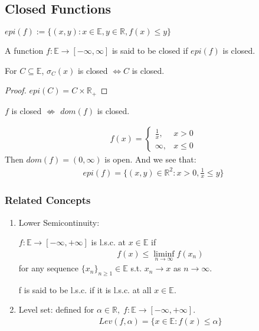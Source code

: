 \documentclass[11pt]{article}
\begin{document}
\subsection{Closed Functions}
\begin{definition}
    $epi(f) := \{ (x,y): x \in \mathbb{E}, y \in \mathbb{R}, f(x) \le y \}$
\end{definition}

\begin{definition}
    A function $f: \mathbb{E} \to [-\infty,\infty]$ is said to be closed if $epi(f)$ is closed.
\end{definition}

\begin{proposition}
    For $C \subseteq \mathbb{E}$, $\sigma_{C}(x)$ is closed $\iff C$ is closed.
\end{proposition}
\begin{proof}
    $epi(C) = C \times \mathbb{R}_{+}$
\end{proof}

\begin{remark}
    $f$ is closed $\not\iff$ $dom(f)$ is closed.
\end{remark}

\begin{example}
    \begin{align*}
        f(x) = \begin{cases} 
        \frac{1}{x}, &x > 0  \\ 
        \infty, & x \le 0   
        \end{cases}
    \end{align*}
    Then $dom(f) = (0,\infty)$ is open. And we see that:
    \begin{align*}
        epi(f) = \{ (x,y) \in \mathbb{R}^{2}: x>0, \frac{1}{x} \le y \}
    \end{align*}
\end{example}

\subsubsection{Related Concepts}
\begin{enumerate}
    \item Lower Semicontinuity:
    \begin{definition}
        $f:\mathbb{E} \to [-\infty,+\infty]$ is l.s.c. at $x \in \mathbb{E}$ if 
        \begin{align*}
            f(x) \le \liminf_{n \to \infty} f(x_n) 
        \end{align*}
        for any sequence $\{ x_n  \}_{n\ge 1} \in \mathbb{E}$ s.t.
        $x_n \to x $ as $n \to \infty$.

        f is said to be l.s.c. if it is l.s.c. at all $x \in \mathbb{E}$.
    \end{definition}
    \item Level set: 
    defined for $\alpha \in \mathbb{R}, \; f:\mathbb{E} \to [-\infty,+\infty]$.
    \begin{align*}
        Lev(f,\alpha) = \{ x \in \mathbb{E}:f(x) \le \alpha \}
    \end{align*}
\end{enumerate}
\end{document}
